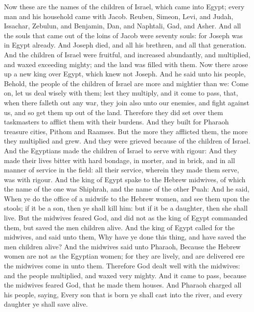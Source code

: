 
\begin{biblechapter} %
 Now these are the names of the children of Israel, which came into Egypt; every man and his household came with Jacob.
\verse Reuben, Simeon, Levi, and Judah,
\verse Issachar, Zebulun, and Benjamin,
\verse Dan, and Naphtali, Gad, and Asher.
\verse And all the souls that came out of the loins of Jacob were seventy souls: for Joseph was in Egypt already.
\verse And Joseph died, and all his brethren, and all that generation.
\verse And the children of Israel were fruitful, and increased abundantly, and multiplied, and waxed exceeding mighty; and the land was filled with them.
\verse Now there arose up a new king over Egypt, which knew not Joseph.
\verse And he said unto his people, Behold, the people of the children of Israel are more and mightier than we:
\verse Come on, let us deal wisely with them; lest they multiply, and it come to pass, that, when there falleth out any war, they join also unto our enemies, and fight against us, and so get them up out of the land.
\verse Therefore they did set over them taskmasters to afflict them with their burdens. And they built for Pharaoh treasure cities, Pithom and Raamses.
\verse But the more they afflicted them, the more they multiplied and grew. And they were grieved because of the children of Israel.
\verse And the Egyptians made the children of Israel to serve with rigour:
\verse And they made their lives bitter with hard bondage, in morter, and in brick, and in all manner of service in the field: all their service, wherein they made them serve, was with rigour.
\verse And the king of Egypt spake to the Hebrew midwives, of which the name of the one was Shiphrah, and the name of the other Puah:
\verse And he said, When ye do the office of a midwife to the Hebrew women, and see them upon the stools; if it be a son, then ye shall kill him: but if it be a daughter, then she shall live.
\verse But the midwives feared God, and did not as the king of Egypt commanded them, but saved the men children alive.
\verse And the king of Egypt called for the midwives, and said unto them, Why have ye done this thing, and have saved the men children alive?
\verse And the midwives said unto Pharaoh, Because the Hebrew women are not as the Egyptian women; for they are lively, and are delivered ere the midwives come in unto them.
\verse Therefore God dealt well with the midwives: and the people multiplied, and waxed very mighty.
\verse And it came to pass, because the midwives feared God, that he made them houses.
\verse And Pharaoh charged all his people, saying, Every son that is born ye shall cast into the river, and every daughter ye shall save alive.
\end{biblechapter}

